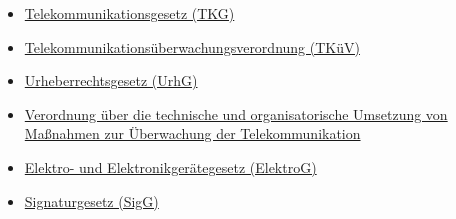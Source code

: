 \documentclass[]{article}
\begin{document}
\begin{itemize}
\item
  \href{http://www.gesetze-im-internet.de/tkg_2004/index.html}{Telekommunikationsgesetz
  (TKG)}
\item
  \href{http://www.gesetze-im-internet.de/tk_v_2005/index.html}{Telekommunikationsüberwachungsverordnung
  (TKüV)}
\item
  \href{http://www.gesetze-im-internet.de/urhg/index.html}{Urheberrechtsgesetz
  (UrhG)}
\item
  \href{https://www.gesetze-im-internet.de/tk_v_2005/index.html\#BJNR313600005BJNE001301308}{Verordnung
  über die technische und organisatorische Umsetzung von Maßnahmen zur
  Überwachung der Telekommunikation}
\item
  \href{http://www.gesetze-im-internet.de/elektrog/index.html}{Elektro-
  und Elektronikgerätegesetz (ElektroG)}
\item
  \href{http://www.gesetze-im-internet.de/sigg_2001/}{Signaturgesetz
  (SigG)}
\end{itemize}
\end{document}
